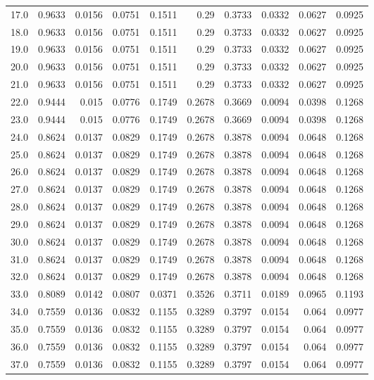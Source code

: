 \begin{longtable}{lrrrrrrrrr}
17.0 & 0.9633 & 0.0156 & 0.0751 & 0.1511 & 0.29 & 0.3733 & 0.0332 & 0.0627 & 0.0925 \\
18.0 & 0.9633 & 0.0156 & 0.0751 & 0.1511 & 0.29 & 0.3733 & 0.0332 & 0.0627 & 0.0925 \\
19.0 & 0.9633 & 0.0156 & 0.0751 & 0.1511 & 0.29 & 0.3733 & 0.0332 & 0.0627 & 0.0925 \\
20.0 & 0.9633 & 0.0156 & 0.0751 & 0.1511 & 0.29 & 0.3733 & 0.0332 & 0.0627 & 0.0925 \\
21.0 & 0.9633 & 0.0156 & 0.0751 & 0.1511 & 0.29 & 0.3733 & 0.0332 & 0.0627 & 0.0925 \\
22.0 & 0.9444 & 0.015 & 0.0776 & 0.1749 & 0.2678 & 0.3669 & 0.0094 & 0.0398 & 0.1268 \\
23.0 & 0.9444 & 0.015 & 0.0776 & 0.1749 & 0.2678 & 0.3669 & 0.0094 & 0.0398 & 0.1268 \\
24.0 & 0.8624 & 0.0137 & 0.0829 & 0.1749 & 0.2678 & 0.3878 & 0.0094 & 0.0648 & 0.1268 \\
25.0 & 0.8624 & 0.0137 & 0.0829 & 0.1749 & 0.2678 & 0.3878 & 0.0094 & 0.0648 & 0.1268 \\
26.0 & 0.8624 & 0.0137 & 0.0829 & 0.1749 & 0.2678 & 0.3878 & 0.0094 & 0.0648 & 0.1268 \\
27.0 & 0.8624 & 0.0137 & 0.0829 & 0.1749 & 0.2678 & 0.3878 & 0.0094 & 0.0648 & 0.1268 \\
28.0 & 0.8624 & 0.0137 & 0.0829 & 0.1749 & 0.2678 & 0.3878 & 0.0094 & 0.0648 & 0.1268 \\
29.0 & 0.8624 & 0.0137 & 0.0829 & 0.1749 & 0.2678 & 0.3878 & 0.0094 & 0.0648 & 0.1268 \\
30.0 & 0.8624 & 0.0137 & 0.0829 & 0.1749 & 0.2678 & 0.3878 & 0.0094 & 0.0648 & 0.1268 \\
31.0 & 0.8624 & 0.0137 & 0.0829 & 0.1749 & 0.2678 & 0.3878 & 0.0094 & 0.0648 & 0.1268 \\
32.0 & 0.8624 & 0.0137 & 0.0829 & 0.1749 & 0.2678 & 0.3878 & 0.0094 & 0.0648 & 0.1268 \\
33.0 & 0.8089 & 0.0142 & 0.0807 & 0.0371 & 0.3526 & 0.3711 & 0.0189 & 0.0965 & 0.1193 \\
34.0 & 0.7559 & 0.0136 & 0.0832 & 0.1155 & 0.3289 & 0.3797 & 0.0154 & 0.064 & 0.0977 \\
35.0 & 0.7559 & 0.0136 & 0.0832 & 0.1155 & 0.3289 & 0.3797 & 0.0154 & 0.064 & 0.0977 \\
36.0 & 0.7559 & 0.0136 & 0.0832 & 0.1155 & 0.3289 & 0.3797 & 0.0154 & 0.064 & 0.0977 \\
37.0 & 0.7559 & 0.0136 & 0.0832 & 0.1155 & 0.3289 & 0.3797 & 0.0154 & 0.064 & 0.0977 \\

\end{longtable}

